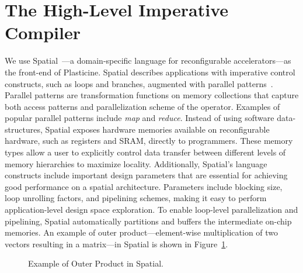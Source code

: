 \section{The High-Level Imperative Compiler} 

We use Spatial~\cite{spatial_koeplinger}---a domain-specific language for reconfigurable
accelerators---as the front-end of Plasticine.
Spatial describes applications with imperative control constructs, such as loops and branches,
augmented with parallel patterns~\cite{parallelpattern}.
Parallel patterns are transformation functions on memory collections that capture both access
patterns and parallelization scheme of the operator.
Examples of popular parallel patterns include \emph{map} and \emph{reduce}.
Instead of using software data-structures, Spatial exposes hardware memories available on reconfigurable
hardware, such as registers and SRAM, directly to programmers.
These memory types allow a user to explicitly control data transfer between different levels of
memory hierarchies to maximize locality.
Additionally, Spatial's language constructs include important design parameters 
that are essential for achieving good performance on a spatial architecture.
Parameters include blocking size, loop unrolling factors, and pipelining schemes, making it
easy to perform application-level design space exploration.
To enable loop-level parallelization and pipelining, Spatial automatically partitions and buffers 
the intermediate on-chip memories.
An example of outer product---element-wise multiplication of two vectors resulting in a matrix---in Spatial is shown in Figure~\ref{fig:spatial_app}.

\begin{figure}
\centering
  \begin{minipage}{0.6\textwidth}

  \end{minipage}
  \caption{Example of Outer Product in Spatial.}
\label{fig:spatial_app}
\end{figure}

